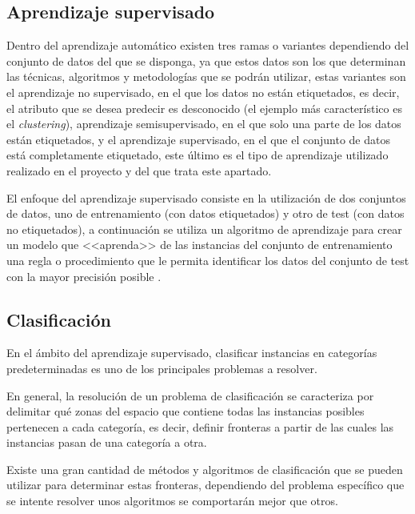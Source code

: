 \subsection{Aprendizaje supervisado}

Dentro del aprendizaje automático existen tres ramas o variantes dependiendo del
conjunto de datos del que se disponga, ya que estos datos son los que determinan
las técnicas, algoritmos y metodologías que se podrán utilizar, estas variantes
son el aprendizaje no supervisado, en el que los datos no están etiquetados, es
decir, el atributo que se desea predecir es desconocido (el ejemplo más
característico es el \textit{clustering}), aprendizaje semisupervisado, en el
que solo una parte de los datos están etiquetados, y el aprendizaje supervisado,
en el que el conjunto de datos está completamente etiquetado, este último es el
tipo de aprendizaje utilizado realizado en el proyecto y del que trata este
apartado.

El enfoque del aprendizaje supervisado consiste en la utilización de dos
conjuntos de datos, uno de entrenamiento (con datos etiquetados) y otro de test
(con datos no etiquetados), a continuación se utiliza un algoritmo de
aprendizaje para crear un modelo que <<aprenda>> de las instancias del conjunto
de entrenamiento una regla o procedimiento que le permita identificar los datos
del conjunto de test con la mayor precisión posible
\cite{learned2014introduction}.


\subsection{Clasificación}

En el ámbito del aprendizaje supervisado, clasificar instancias en categorías
predeterminadas es uno de los principales problemas a resolver.

En general, la resolución de un problema de clasificación se caracteriza por
delimitar qué zonas del espacio que contiene todas las instancias posibles
pertenecen a cada categoría, es decir, definir fronteras a partir de las cuales
las instancias pasan de una categoría a otra.

Existe una gran cantidad de métodos y algoritmos de clasificación que se pueden
utilizar para determinar estas fronteras, dependiendo del problema específico
que se intente resolver unos algoritmos se comportarán mejor que otros.


